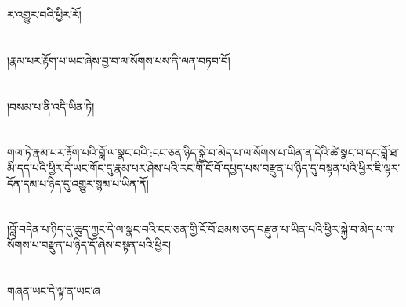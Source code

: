 ར་འགྱུར་བའི་ཕྱིར་རོ།\chapter{ }།རྣམ་པར་རྟོག་པ་ཡང་ཞེས་བྱ་བ་ལ་སོགས་པས་ནི་ལན་བཏབ་བོ།\chapter{ }།བསམ་པ་ནི་འདི་ཡིན་ཏེ།\chapter{ }གལ་ཏེ་རྣམ་པར་རྟོག་པའི་བློ་ལ་སྣང་བའི་:ངང་ཅན་ཉིད་སྐྱེ་བ་མེད་པ་ལ་སོགས་པ་ཡིན་ན་དེའི་ཚེ་སྣང་བ་དང་བློ་ཐ་མི་དད་པའི་ཕྱིར་དེ་ཡང་གོང་དུ་རྣམ་པར་ཤེས་པའི་རང་གི་ངོ་བོ་དཔྱད་པས་བརྫུན་པ་ཉིད་དུ་བསྟན་པའི་ཕྱིར་ཇི་ལྟར་དོན་དམ་པ་ཉིད་དུ་འགྱུར་སྙམ་པ་ཡིན་ནོ།\chapter{ }།བློ་བདེན་པ་ཉིད་དུ་ཆུད་ཀྱང་དེ་ལ་སྣང་བའི་ངང་ཅན་གྱི་ངོ་བོ་ཐམས་ཅད་བརྫུན་པ་ཡིན་པའི་ཕྱིར་སྐྱེ་བ་མེད་པ་ལ་སོགས་པ་བརྫུན་པ་ཉིད་དོ་ཞེས་བསྟན་པའི་ཕྱིར།\chapter{ }གཞན་ཡང་དེ་ལྟ་ན་ཡང་ཞ